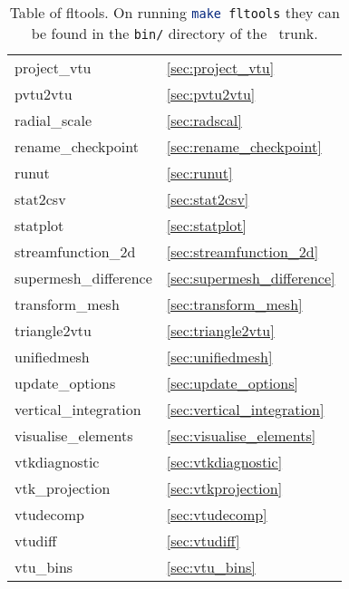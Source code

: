 \begin{table}
\begin{center}
\begin{tabular}{| l | l |}
	project\_vtu				& \ref{sec:project_vtu} 		\\
	pvtu2vtu				& \ref{sec:pvtu2vtu}			\\
        radial\_scale                           & \ref{sec:radscal}                     \\
	rename\_checkpoint			& \ref{sec:rename_checkpoint}		\\
	runut           			& \ref{sec:runut}		        \\
	stat2csv				& \ref{sec:stat2csv}			\\
	statplot				& \ref{sec:statplot} 			\\
	streamfunction\_2d			& \ref{sec:streamfunction_2d} 		\\
	supermesh\_difference			& \ref{sec:supermesh_difference} 	\\
	transform\_mesh				& \ref{sec:transform_mesh}		\\
	triangle2vtu				& \ref{sec:triangle2vtu}		\\
	unifiedmesh				& \ref{sec:unifiedmesh} 		\\
	update\_options				& \ref{sec:update_options}		\\	
	vertical\_integration			& \ref{sec:vertical_integration} 	\\
    visualise\_elements     & \ref{sec:visualise_elements} \\ 
	vtkdiagnostic				& \ref{sec:vtkdiagnostic}		\\
	vtk\_projection				& \ref{sec:vtkprojection}		\\
	vtudecomp				& \ref{sec:vtudecomp}			\\
	vtudiff					& \ref{sec:vtudiff}			\\
	vtu\_bins           			& \ref{sec:vtu_bins}			\\
    \hline
  \end{tabular}
\end{center}
\caption[Table of fltools]{Table of fltools. On running \lstinline[language = bash]+make fltools+ they can be found in the \lstinline[language = bash]+bin/+ directory of the \fluidity\ trunk.}
\label{tab:fltools}
\end{table}


